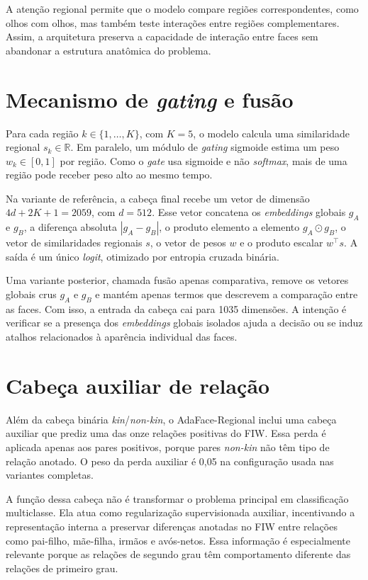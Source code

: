 A atenção regional permite que o modelo compare regiões correspondentes, como olhos com olhos, mas também teste interações entre regiões complementares. Assim, a arquitetura preserva a capacidade de interação entre faces sem abandonar a estrutura anatômica do problema.

\section{Mecanismo de \textit{gating} e fusão}

Para cada região $k \in \{1, \ldots, K\}$, com $K = 5$, o modelo calcula uma similaridade regional $s_k \in \mathbb{R}$. Em paralelo, um módulo de \textit{gating} sigmoide estima um peso $w_k \in [0,1]$ por região. Como o \textit{gate} usa sigmoide e não \textit{softmax}, mais de uma região pode receber peso alto ao mesmo tempo.

Na variante de referência, a cabeça final recebe um vetor de dimensão $4d + 2K + 1 = 2059$, com $d = 512$. Esse vetor concatena os \textit{embeddings} globais $g_A$ e $g_B$, a diferença absoluta $|g_A - g_B|$, o produto elemento a elemento $g_A \odot g_B$, o vetor de similaridades regionais $s$, o vetor de pesos $w$ e o produto escalar $w^\top s$. A saída é um único \textit{logit}, otimizado por entropia cruzada binária.

Uma variante posterior, chamada fusão apenas comparativa, remove os vetores globais crus $g_A$ e $g_B$ e mantém apenas termos que descrevem a comparação entre as faces. Com isso, a entrada da cabeça cai para 1035 dimensões. A intenção é verificar se a presença dos \textit{embeddings} globais isolados ajuda a decisão ou se induz atalhos relacionados à aparência individual das faces.

\section{Cabeça auxiliar de relação}

Além da cabeça binária \textit{kin}/\textit{non-kin}, o AdaFace-Regional inclui uma cabeça auxiliar que prediz uma das onze relações positivas do FIW. Essa perda é aplicada apenas aos pares positivos, porque pares \textit{non-kin} não têm tipo de relação anotado. O peso da perda auxiliar é 0,05 na configuração usada nas variantes completas.

A função dessa cabeça não é transformar o problema principal em classificação multiclasse. Ela atua como regularização supervisionada auxiliar, incentivando a representação interna a preservar diferenças anotadas no FIW entre relações como pai-filho, mãe-filha, irmãos e avós-netos. Essa informação é especialmente relevante porque as relações de segundo grau têm comportamento diferente das relações de primeiro grau.

